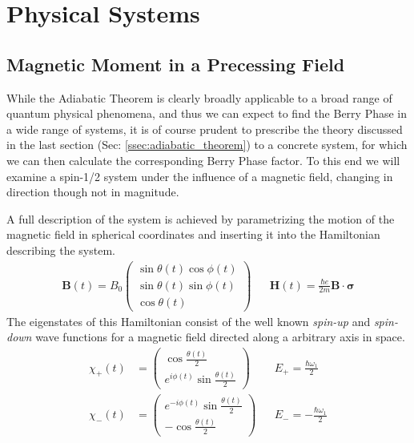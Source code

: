 \documentclass{article}
\begin{document}
\section{Physical Systems}\label{sec:physical_systems}
\subsection{Magnetic Moment in a Precessing Field}\label{ssec:magnetic_moment}

While the Adiabatic Theorem is clearly broadly applicable to a broad range of quantum physical phenomena, and thus we can expect to find the Berry Phase in a wide range of systems, it is of course prudent to prescribe the theory discussed in the last section (Sec: \ref{ssec:adiabatic_theorem}) to a concrete system, for which we can then calculate the corresponding Berry Phase factor. To this end we will examine a spin-1/2 system under the influence of a magnetic field, changing in direction though not in magnitude.
  
A full description of the system is achieved by parametrizing the motion of the magnetic field in spherical coordinates and inserting it into the Hamiltonian describing the system.
      \begin{align*}
        \bm{B}(t) = B_{0} \begin{pmatrix} 
                                          \sin\theta(t)\cos\phi(t)\\
                                          \sin\theta(t)\sin\phi(t)\\
                                          \cos\theta(t)
                           \end{pmatrix}
        && \bm{H}(t) = \frac{\hbar e}{2m}\bm{B} \cdot \bm{\sigma}
      \end{align*}
The eigenstates of this Hamiltonian consist of the well known \textit{spin-up} and \textit{spin-down} wave functions for a magnetic field directed along a arbitrary axis in space. 
      \begin{align*}
        \chi_{+}(t) &= \begin{pmatrix} 
                                      \cos\frac{\theta(t)}{2}\\
                                      e^{i\phi(t)} \sin \frac{\theta(t)}{2}
                       \end{pmatrix} 
                       && E_{+} = \frac{\hbar \omega_{1}}{2}\\
       \chi_{-}(t) &= \begin{pmatrix} 
                                     e^{-i\phi(t)}\sin\frac{\theta(t)}{2}\\
                                     -\cos\frac{\theta(t)}{2}
                       \end{pmatrix} 
                       && E_{-} = -\frac{\hbar \omega_{1}}{2}
      \end{align*}
\end{document}
